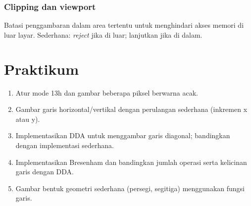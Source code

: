 \subsubsection{Clipping dan viewport}
Batasi penggambaran dalam area tertentu untuk menghindari akses memori di luar layar. Sederhana: \textit{reject} jika di luar; lanjutkan jika di dalam.

\section{Praktikum}
\begin{enumerate}
  \item Atur mode 13h dan gambar beberapa piksel berwarna acak.
  \item Gambar garis horizontal/vertikal dengan perulangan sederhana (inkremen x atau y).
  \item Implementasikan DDA untuk menggambar garis diagonal; bandingkan dengan implementasi sederhana.
  \item Implementasikan Bresenham dan bandingkan jumlah operasi serta kelicinan garis dengan DDA.
  \item Gambar bentuk geometri sederhana (persegi, segitiga) menggunakan fungsi garis.
\end{enumerate}

